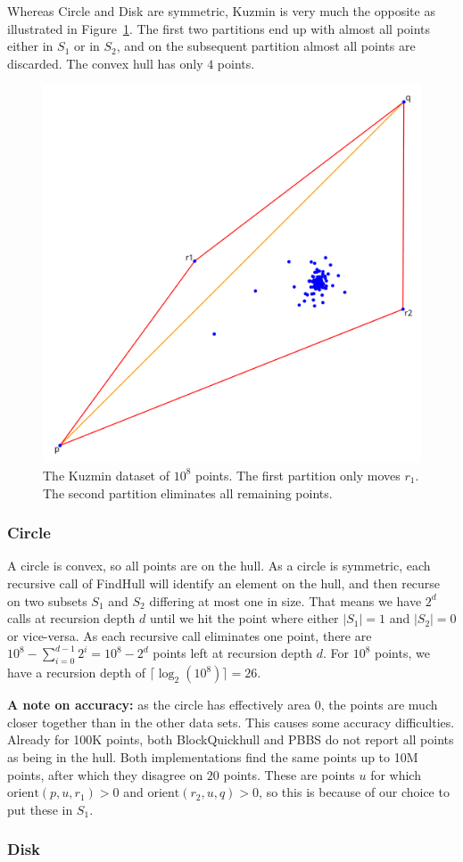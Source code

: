 Whereas Circle and Disk are symmetric, Kuzmin is very much the opposite
as illustrated in Figure~\ref{fig:kuzmin}.
The first two partitions end up with almost all points either in $S_1$ or
in $S_2$, and on the subsequent partition almost all points are discarded.
The convex hull has only $4$ points.

\begin{figure}[ht]
    \includegraphics[width=0.3\columnwidth]{./figures/rust-kuzmin.png}
    \caption{The Kuzmin dataset of $10^8$ points. The first partition only
             moves $r_1$. The second partition eliminates all remaining points.}
    \label{fig:kuzmin}
\end{figure}

\subsubsection{Circle}

A circle is convex, so all points are on the hull. As a circle is symmetric,
each recursive call of FindHull will identify an element on the hull, and
then recurse on two subsets $S_1$ and $S_2$ differing at most one in size.
That means we have $2^d$ calls at recursion depth $d$ until we hit the point 
where either $|S_1| = 1$ and $|S_2| = 0$ or vice-versa. 
As each recursive call eliminates one point, there are
$10^8 - \sum_{i = 0}^{d - 1} 2^i = 10^8 - 2^{d}$ points left at recursion 
depth $d$. For $10^8$ points, we have a recursion depth of 
$\lceil \log_{2}(10^8) \rceil = 26$.

\textbf{A note on accuracy: }as the circle has effectively area $0$, the 
points are much closer together than in the other data sets.
This causes some accuracy difficulties. Already for 100K points, 
both BlockQuickhull and PBBS do not report all points as being in the hull. Both 
implementations find the same points up to 10M points, after which they disagree
on $20$ points. These are points $u$ for which $\text{orient}(p, u, r_1) > 0$
and $\text{orient}(r_2, u, q) > 0$, so this is because of our choice to put
these in $S_1$. 

\subsubsection{Disk}

